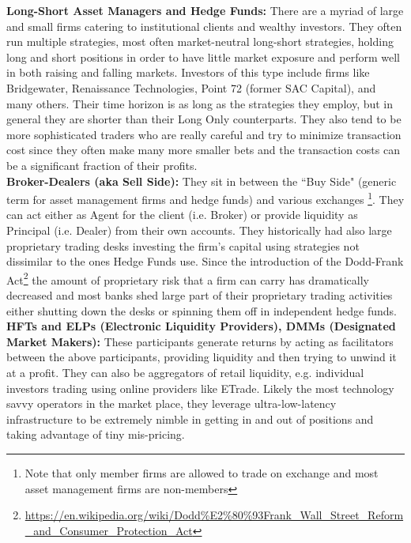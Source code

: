 \noindent\textbf{ Long-Short Asset Managers and Hedge Funds:} There are a myriad of large and small firms catering to institutional clients and wealthy investors. They often run multiple strategies, most often market-neutral long-short strategies, holding long and short positions in order to have little market exposure and  perform well in both raising and falling markets. Investors of this type include firms like Bridgewater, Renaissance Technologies, Point 72 (former SAC Capital), and many others. Their time horizon is as long as the strategies they employ, but in general they are shorter than their Long Only counterparts. They also tend to be more sophisticated traders who are really careful and try to minimize transaction cost since they often make many more smaller bets and the transaction costs can be a significant fraction of their profits. \\




\noindent\textbf{ Broker-Dealers (aka Sell Side):} They sit in between the ``Buy Side" (generic term for asset management firms and hedge funds) and various exchanges \footnote{Note that only member firms are allowed to trade on exchange and most asset management firms are non-members}. They can act either as Agent for the client (i.e. Broker) or provide liquidity as Principal (i.e. Dealer) from their own accounts. They historically had  also large proprietary trading desks investing the firm's capital using strategies not dissimilar to the ones Hedge Funds use. Since the introduction of the Dodd-Frank Act\footnote{\url{https://en.wikipedia.org/wiki/Dodd\%E2\%80\%93Frank_Wall_Street_Reform_and_Consumer_Protection_Act}} the amount of proprietary risk that a firm can carry has dramatically decreased and most banks shed large part of their proprietary trading activities either shutting down the desks or spinning them off in independent hedge funds. \\


\noindent\textbf{HFTs and ELPs (Electronic Liquidity Providers), DMMs (Designated Market Makers):} These participants generate returns by acting as facilitators between the above participants, providing liquidity and then trying to unwind it at a profit. They can also be aggregators of retail liquidity, e.g. individual investors trading using online providers like ETrade. Likely the most technology savvy operators in the market place, they leverage ultra-low-latency infrastructure to be extremely nimble in getting in and out of positions and taking advantage of tiny mis-pricing. 



